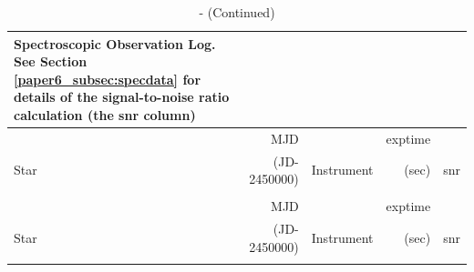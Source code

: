 \begin{scriptsize}
\begin{longtable}{|l|rlrr|}
    
    \caption{Spectroscopic Observation Log.\\
             See Section \ref{paper6_subsec:specdata} for details of the signal-to-noise ratio calculation (the snr column) \label{paper6_tab:observations}}
    \\ \hline
      &  MJD &   & exptime &  \\
       Star &  (JD-2450000) &   Instrument & (sec) & snr \\ \hline
    \endfirsthead

    \caption{ - (Continued)}
    \\ \hline
    &  MJD &   & exptime &  \\
       Star &  (JD-2450000) &   Instrument & (sec) & snr \\ \hline
    \endhead

    \hline
    \endfoot

    \hline
    \endlastfoot
  


\end{longtable}
\end{scriptsize}
